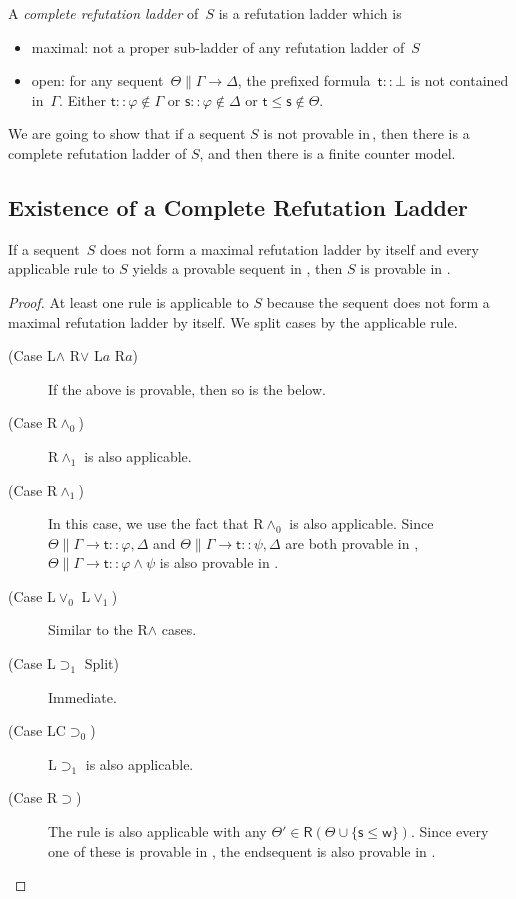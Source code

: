\begin{definition}
A \textit{complete refutation ladder} of~$S$ is a refutation ladder which is
\begin{itemize}
 \item maximal: not a proper sub-ladder of any
       refutation ladder of~$S$
 \item open:
       for any sequent~$\Theta\parallel \Gamma\longrightarrow \Delta$,
      the prefixed formula~$\mathsf t::\bot$ is not contained in~$\Gamma$.       
       Either
       $\mathsf t::\varphi\notin \Gamma$ or
       $\mathsf s::\varphi\notin\Delta$ or $\mathsf t\le \mathsf s\notin
       \Theta$.
\end{itemize} 
\end{definition}

We are going to show that
if a sequent $S$ is not provable in\,\LB, then there is a complete
refutation ladder of $S$, and then there is a finite counter model.

\subsection{Existence of a Complete Refutation Ladder}

\begin{lemma}\label{chooser}
 If a sequent~$S$ does not form a maximal refutation ladder by itself and
 every applicable rule to $S$ yields a provable
 sequent in \LB, then $S$ is provable in \LB.
\end{lemma}
\begin{proof}
 At least one rule is applicable to $S$ because the sequent does
 not form a maximal refutation ladder by itself. We split cases by the
 applicable rule.
 \begin{description}
  \item[ (Case L$\wedge$ R$\vee$ L$a$ R$a$)]
	    If the above is provable, then so is the below.
  \item[ (Case R$\wedge_0$)]
	     R$\wedge_1$ is also applicable.
  \item[ (Case R$\wedge_1$)]
	     In this case, we use the fact that R$\wedge_0$ is also
	     applicable.
	     Since $\Theta\parallel\Gamma\longrightarrow \mathsf t::\varphi, \Delta$ and
	     $\Theta\parallel\Gamma\longrightarrow \mathsf t::\psi,
	     \Delta$ are both provable in \LB,
	     $\Theta\parallel\Gamma\longrightarrow \mathsf
	     t::\varphi\wedge\psi$ is also provable in \LB.
  \item[ (Case L$\vee_0$ L$\vee_1$)]
	     Similar to the R$\wedge$ cases.
  \item[ (Case L$\supset_1$ Split)] Immediate.
  \item[ (Case LC$\supset_0$)]
	     L$\supset_1$ is also applicable.
  \item[ (Case R$\supset$)]
	     The rule is also applicable with any $\Theta'\in
	     \mathsf R(\Theta\cup\{\mathsf s\le \mathsf w\})$. Since every one of these is
	     provable in \LB,
	     the endsequent is also provable in \LB.
 \end{description}
\end{proof}

